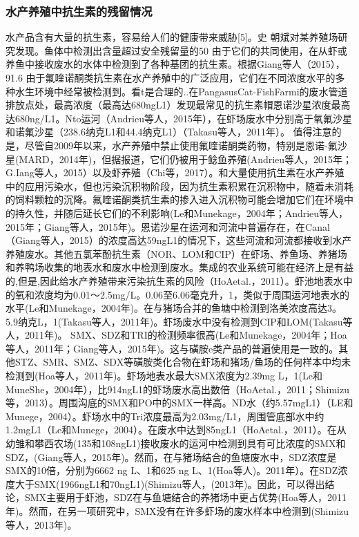 \documentclass{SCIS2020cn}
\begin{document}
\subsubsection{水产养殖中抗生素的残留情况}

	水产品含有大量的抗生素，容易给人们的健康带来威胁[5]。史
    朝斌对某养殖场研究发现。鱼体中检测出含量超过安全残留量的50%
由于它们的共同使用，在从虾或养鱼中接收废水的水体中检测到了各种基团的抗生素。根据Giang等人（2015），91.6%
由于氟喹诺酮类抗生素在水产养殖中的广泛应用，它们在不同浓度水平的多种水生环境中经常被检测到。看t是合理的..在PangasusCat-FishFarmi的废水管道排放点处，最高浓度（最高达680ngL1）发现最常见的抗生素帽恩诺沙星浓度最高达680ng/L1。Nto运河（Andrieu等人，2015年），在虾场废水中分别高于氧氟沙星和诺氟沙星（238.6纳克L1和44.4纳克L1）（Takasu等人，2011年）。
值得注意的是，尽管自2009年以来，水产养殖中禁止使用氟喹诺酮类药物，特别是恩诺-氟沙星(MARD，2014年)，但据报道，它们仍被用于鲶鱼养殖(Andrieu等人，2015年；G.Iang等人，2015）以及虾养殖（Chi等，2017）。和大量使用抗生素在水产养殖中的应用污染水，但也污染沉积物阶段，因为抗生素积累在沉积物中，随着未消耗的饲料颗粒的沉降。氟喹诺酮类抗生素的掺入进入沉积物可能会增加它们在环境中的持久性，并随后延长它们的不利影响(Le和Munekage，2004年；Andrieu等人，2015年；Giang等人，2015年)。恩诺沙星在运河和河流中普遍存在，在Canal（Giang等人，2015）的浓度高达59ngL1的情况下，这些河流和河流都接收到水产养殖废水。其他五氯苯酚抗生素（NOR、LOM和CIP）在虾场、养鱼场、养猪场和养鸭场收集的地表水和废水中检测到废水。集成的农业系统可能在经济上是有益的,但是,因此给水产养殖带来污染抗生素的风险（HoAetal.，2011）。虾池地表水中的氧和浓度均为0.01～2.5mg/L。0.06至6.06毫克升，1，类似于周围运河地表水的水平(Le和Munekage，2004年)。在与猪场合并的鱼塘中检测到洛美浓度高达3。5.9纳克L，1(Takasu等人，2011年)。虾场废水中没有检测到CIP和LOM(Takasu等人，2011年)。
SMX、SDZ和TRI的检测频率很高(Le和Munekage，2004年；Hoa等人，2011年；Giang等人，2015年)。这与磺胺e类产品的普遍使用是一致的。其他STZ、SMR、SMZ、SDX等磺胺类化合物在虾场和猪场/鱼场的任何样本中均未检测到(Hoa等人，2011年)。虾场地表水最大SMX浓度为2.39mg L，1(Le和MuneShe，2004年），比914ngL1的虾场废水高出数倍（HoAetal.，2011；Shimizu等，2013）。周围沟底的SMX和PO中的SMX一样高。ND水（约5.57mgL1）（LE和Munege，2004）。虾场水中的Tri浓度最高为2.03mg/L1，周围管底部水中约1.2mgL1（Le和Munege，2004）。在废水中达到85ngL1（HoAetal.，2011）。在从幼雏和攀西农场(135和108ngL1)接收废水的运河中检测到具有可比浓度的SMX和SDZ，(Giang等人，2015年)。然而，在与猪场结合的鱼塘废水中，SDZ浓度是SMX的10倍，分别为6662 ng L、1和625 ng L、1(Hoa等人)。2011年）。在SDZ浓度大于SMX(1966ngL1和70ngL1)(Shimizu等人，(2013年)。因此，可以得出结论，SMX主要用于虾池，SDZ在与鱼塘结合的养猪场中更占优势(Hoa等人，2011年)。然而，在另一项研究中，SMX没有在许多虾场的废水样本中检测到(Shimizu等人，2013年)。
\end{document}
